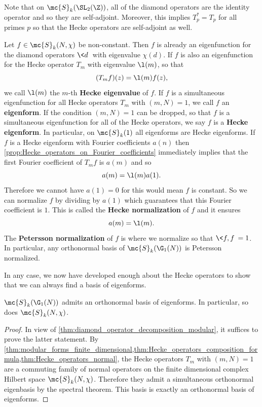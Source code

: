 \documentclass[12pt]{article}
\begin{document}
      \begin{remark}
        Note that on \(\mc{S}_{k}(\SL_{2}(\Z))\), all of the diamond operators are the identity operator and so they are self-adjoint. Moreover, this implies \(T_{p}^{\ast} = T_{p}\) for all primes \(p\) so that the Hecke operators are self-adjoint as well.
      \end{remark}
      
      Let \(f \in \mc{S}_{k}(N,\chi)\) be non-constant. Then \(f\) is already an eigenfunction for the diamond operators \(\<d\>\) with eigenvalue \(\chi(d)\). If \(f\) is also an eigenfunction for the Hecke operator \(T_{m}\) with eigenvalue \(\l(m)\), so that
      \[
        (T_{m}f)(z) = \l(m)f(z),
      \]
      we call \(\l(m)\) the \(m\)-th \textbf{Hecke eigenvalue} of \(f\). If \(f\) is a simultaneous eigenfunction for all Hecke operators \(T_{m}\) with \((m,N) = 1\), we call \(f\) an \textbf{eigenform}. If the condition \((m,N) = 1\) can be dropped, so that \(f\) is a simultaneous eigenfunction for all of the Hecke operators, we say \(f\) is a \textbf{Hecke eigenform}. In particular, on \(\mc{S}_{k}(1)\) all eigenforms are Hecke eigenforms. If \(f\) is a Hecke eigenform with Fourier coefficients \(a(n)\) then \cref{prop:Hecke_operators_on_Fourier_coefficients} immediately implies that the first Fourier coefficient of \(T_{m}f\) is \(a(m)\) and so
      \[
        a(m) = \l(m)a(1).
      \]
      Therefore we cannot have \(a(1) = 0\) for this would mean \(f\) is constant. So we can normalize \(f\) by dividing by \(a(1)\) which guarantees that this Fourier coefficient is \(1\). This is called the \textbf{Hecke normalization} of \(f\) and it ensures
      \[
        a(m) = \l(m).
      \]
      The \textbf{Petersson normalization} of \(f\) is where we normalize so that \(\<f,f\> = 1\). In particular, any orthonormal basis of \(\mc{S}_{k}(\G_{1}(N))\) is Petersson normalized. 
      
      In any case, we now have developed enough about the Hecke operators to show that we can always find a basis of eigenforms.

      \begin{theorem}\label{thm:eigenforms_forms_spectral_theory_modular}
        \(\mc{S}_{k}(\G_{1}(N))\) admits an orthonormal basis of eigenforms. In particular, so does \(\mc{S}_{k}(N,\chi)\).
      \end{theorem}
      \begin{proof}
        In view of \cref{thm:diamond_operator_decomposition_modular}, it suffices to prove the latter statement. By \cref{thm:modular_forms_finite_dimensional,thm:Hecke_operators_composition_formula,thm:Hecke_operators_normal}, the Hecke operators \(T_{m}\) with \((m,N) = 1\) are a commuting family of normal operators on the finite dimensional complex Hilbert space \(\mc{S}_{k}(N,\chi)\). Therefore they admit a simultaneous orthonormal eigenbasis by the spectral theorem. This basis is exactly an orthonormal basis of eigenforms.
      \end{proof}
\end{document}
